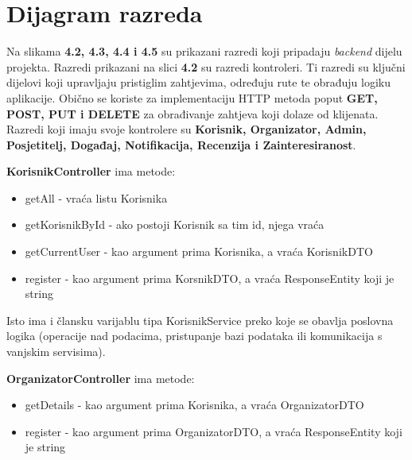 			
			
		\section{Dijagram razreda}
		
			Na slikama \textbf{4.2, 4.3, 4.4 i 4.5} su prikazani razredi koji pripadaju \textit{backend} dijelu projekta. 
			\newline
			\newline
			Razredi prikazani na slici \textbf{4.2} su razredi kontroleri. Ti razredi su ključni dijelovi koji upravljaju pristiglim zahtjevima, određuju rute te obrađuju logiku aplikacije. Obično se koriste za implementaciju HTTP metoda poput \textbf{GET, POST, PUT i DELETE} za obrađivanje zahtjeva koji dolaze od klijenata. Razredi koji imaju svoje kontrolere su \textbf{Korisnik, Organizator, Admin, Posjetitelj, Događaj, Notifikacija, Recenzija i Zainteresiranost}.
			\newline
			
			\textbf{KorisnikController} ima metode: 
			\begin{itemize}
				\item getAll - vraća listu Korisnika
				\item getKorisnikById - ako postoji Korisnik sa tim id, njega vraća
				\item getCurrentUser - kao argument prima Korisnika, a vraća KorisnikDTO
				\item register - kao argument prima KorsnikDTO, a vraća ResponseEntity koji je string
			\end{itemize}
			
			Isto ima i člansku varijablu tipa KorisnikService preko koje se obavlja poslovna logika (operacije nad podacima, pristupanje bazi podataka ili komunikacija s vanjskim servisima).
			\newline
			
				\textbf{OrganizatorController} ima metode: 
			\begin{itemize}
				\item getDetails - kao argument prima Korisnika, a vraća OrganizatorDTO
				\item register - kao argument prima OrganizatorDTO, a vraća ResponseEntity koji je string
			\end{itemize}
			
